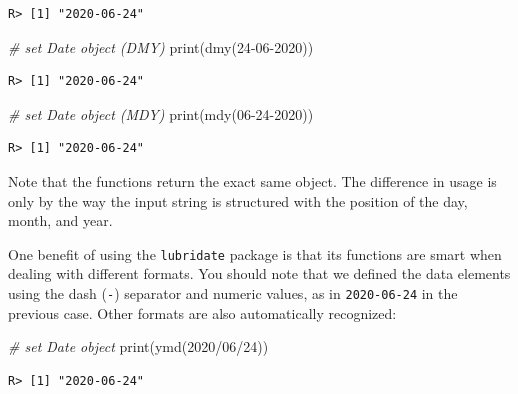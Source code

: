 \documentclass[
  12pt,
]{book}
\newenvironment{Shaded}{\begin{snugshade}}{\end{snugshade}}
\newcommand{\CommentTok}[1]{\textcolor[rgb]{0.37,0.37,0.37}{\textit{#1}}}
\newcommand{\FunctionTok}[1]{\textcolor[rgb]{0,0,0}{#1}}
\newcommand{\NormalTok}[1]{#1}
\newcommand{\StringTok}[1]{\textcolor[rgb]{0.5,0.5,0.5}{#1}}
\begin{document}
\begin{verbatim}
R> [1] "2020-06-24"
\end{verbatim}

\begin{Shaded}
\begin{Highlighting}[]
\CommentTok{\# set Date object (DMY)}
\FunctionTok{print}\NormalTok{(}\FunctionTok{dmy}\NormalTok{(}\StringTok{\textquotesingle{}24{-}06{-}2020\textquotesingle{}}\NormalTok{))}
\end{Highlighting}
\end{Shaded}

\begin{verbatim}
R> [1] "2020-06-24"
\end{verbatim}

\begin{Shaded}
\begin{Highlighting}[]
\CommentTok{\# set Date object (MDY)}
\FunctionTok{print}\NormalTok{(}\FunctionTok{mdy}\NormalTok{(}\StringTok{\textquotesingle{}06{-}24{-}2020\textquotesingle{}}\NormalTok{))}
\end{Highlighting}
\end{Shaded}

\begin{verbatim}
R> [1] "2020-06-24"
\end{verbatim}

Note that the functions return the exact same object. The difference in usage is only by the way the input string is structured with the position of the day, month, and year.

One benefit of using the \texttt{lubridate} package is that its functions are smart when dealing with different formats. You should note that we defined the data elements using the dash (\texttt{-}) separator and numeric values, as in \texttt{\textquotesingle{}2020-06-24\textquotesingle{}} in the previous case. Other formats are also automatically recognized:

\begin{Shaded}
\begin{Highlighting}[]
\CommentTok{\# set Date object }
\FunctionTok{print}\NormalTok{(}\FunctionTok{ymd}\NormalTok{(}\StringTok{\textquotesingle{}2020/06/24\textquotesingle{}}\NormalTok{))}
\end{Highlighting}
\end{Shaded}

\begin{verbatim}
R> [1] "2020-06-24"
\end{verbatim}
\end{document}

